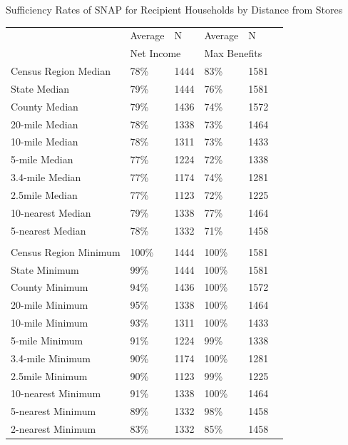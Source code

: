 \documentclass{beamer}
\begin{document}
\begin{frame}

\begin{table}[htbp]{Sufficiency Rates of SNAP for Recipient Households by Distance from Stores}

\begin{adjustbox}{height=1.5in}
  \centering
    \begin{tabular}{llllll}
    \toprule
          & Average  & N     & Average  & N \\

     & \multicolumn{2}{l}{Net Income} & \multicolumn{2}{l}{Max Benefits} \\

    \midrule
    Census Region Median & 78\%    & 1444  & 83\%    & 1581 \\
    State Median & 79\%    & 1444  & 76\%    & 1581 \\
    County Median & 79\%    & 1436  & 74\%    & 1572 \\
    20-mile Median & 78\%    & 1338  & 73\%    & 1464 \\
    10-mile Median & 78\%    & 1311  & 73\%    & 1433 \\
    5-mile Median & 77\%    & 1224  & 72\%    & 1338 \\
    3.4-mile Median & 77\%    & 1174  & 74\%    & 1281 \\
    2.5mile Median & 77\%    & 1123  & 72\%    & 1225 \\
    10-nearest Median & 79\%    & 1338  & 77\%    & 1464 \\
    5-nearest Median & 78\%    & 1332  & 71\%    & 1458 \\
          &       &          &           &  \\

    Census Region Minimum & 100\%  & 1444  & 100\%   & 1581 \\
    State Minimum & 99\%   & 1444  & 100\%   & 1581 \\
    County Minimum & 94\%   & 1436  & 100\%   & 1572 \\
    20-mile Minimum & 95\%    & 1338  & 100\%   & 1464 \\
    10-mile Minimum & 93\%    & 1311  & 100\%   & 1433 \\
    5-mile Minimum & 91\%    & 1224  & 99\%    & 1338 \\
    3.4-mile Minimum & 90\%    & 1174  & 100\%   & 1281 \\
    2.5mile Minimum & 90\%    & 1123  & 99\%    & 1225 \\
    10-nearest Minimum & 91\%    & 1338  & 100\%   & 1464 \\
    5-nearest Minimum & 89\%    & 1332  & 98\%    & 1458 \\
    2-nearest Minimum & 83\%    & 1332  & 85\%    & 1458 \\
    \bottomrule
    \end{tabular}
    \end{adjustbox}
	\end{table}

\end{frame}
\end{document}
